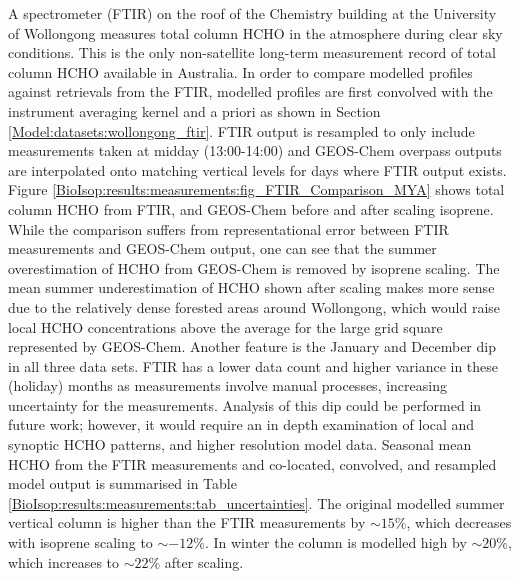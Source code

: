     
    A spectrometer (FTIR) on the roof of the Chemistry building at the University of Wollongong measures total column HCHO in the atmosphere during clear sky conditions.
    This is the only non-satellite long-term measurement record of total column HCHO available in Australia.
    In order to compare modelled profiles against retrievals from the FTIR, modelled profiles are first convolved with the instrument averaging kernel and a priori as shown in Section \ref{Model:datasets:wollongong_ftir}.
    FTIR output is resampled to only include measurements taken at midday (13:00-14:00) and GEOS-Chem overpass outputs are interpolated onto matching vertical levels for days where FTIR output exists.
    Figure \ref{BioIsop:results:measurements:fig_FTIR_Comparison_MYA} shows total column HCHO from FTIR, and GEOS-Chem before and after scaling isoprene.
    While the comparison suffers from representational error between FTIR measurements and GEOS-Chem output, one can see that the summer overestimation of HCHO from GEOS-Chem is removed by isoprene scaling.
    The mean summer underestimation of HCHO shown after scaling makes more sense due to the relatively dense forested areas around Wollongong, which would raise local HCHO concentrations above the average for the large grid square represented by GEOS-Chem.
    Another feature is the January and December dip in all three data sets.
    FTIR has a lower data count and higher variance in these (holiday) months as measurements involve manual processes, increasing uncertainty for the measurements.
    Analysis of this dip could be performed in future work; however, it would require an in depth examination of local and synoptic HCHO patterns, and higher resolution model data.
    Seasonal mean HCHO from the FTIR measurements and co-located, convolved, and resampled model output is summarised in Table \ref{BioIsop:results:measurements:tab_uncertainties}.
    The original modelled summer vertical column is higher than the FTIR measurements by $\sim{15}\%$, which decreases with isoprene scaling to $\sim{-12}\%$.
    In winter the column is modelled high by $\sim{20}\%$, which increases to $\sim{22}\%$ after scaling.
    
